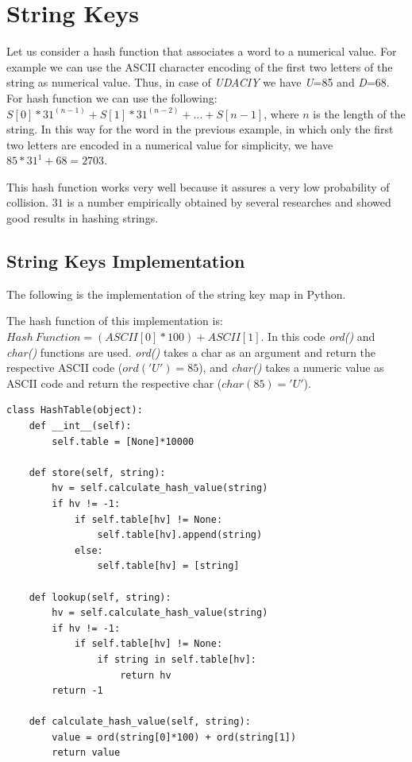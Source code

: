 \section{String Keys}
Let us consider a hash function that associates a word to a numerical value. For example we can use the ASCII character encoding of the first two letters of the string as numerical value. Thus, in case of \textit{UDACIY} we have \textit{U}=85 and \textit{D}=68. For hash function we can use the following: \(S\left[0\right] * 31^{(n-1)} + S\left[1\right] * 31^{(n-2)} + \ldots + S\left[n-1\right]\), where \(n\) is the length of the string. In this way for the word in the previous example, in which only the first two letters are encoded in a numerical value for simplicity, we have \(85*31^{1} + 68 = 2703\).

This hash function works very well because it assures a very low probability of collision. \(31\) is a number empirically obtained by several researches and showed good results in hashing strings.

\subsection{String Keys Implementation}
The following is the implementation of the string key map in Python.

The hash function of this implementation is: \(Hash \ Function = (ASCII[0]*100) + ASCII[1]\). In this code \textit{ord()} and \textit{char()} functions are used. \textit{ord()} takes a char as an argument and return the respective ASCII code (\(ord('U')=85\)), and \textit{char()} takes a numeric value as ASCII code and return the respective char (\(char(85)='U'\)).
\begin{lstlisting}[caption={String key implementation.}]
class HashTable(object):
	def __int__(self):
		self.table = [None]*10000
	
	def store(self, string):
		hv = self.calculate_hash_value(string)
		if hv != -1:
			if self.table[hv] != None:
				self.table[hv].append(string)
			else:
				self.table[hv] = [string]
	
	def lookup(self, string):
		hv = self.calculate_hash_value(string)
		if hv != -1:
			if self.table[hv] != None:
				if string in self.table[hv]:
					return hv
		return -1
	
	def calculate_hash_value(self, string):
		value = ord(string[0]*100) + ord(string[1])
		return value
\end{lstlisting}